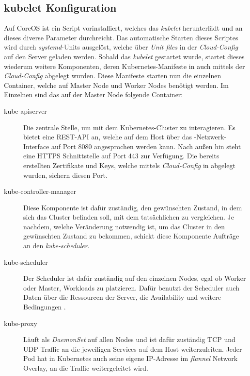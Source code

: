 \subsection{kubelet Konfiguration}
Auf CoreOS ist ein Script vorinstalliert, welches das \emph{kubelet} herunterlädt und
an dieses diverse Parameter durchreicht.
Das automatische Starten dieses Scriptes wird durch \emph{systemd}-Units ausgelöst,
welche über \emph{Unit files} in der \emph{Cloud-Config} auf den Server geladen werden.
Sobald das \emph{kubelet} gestartet wurde, startet dieses wiederum weitere Komponenten,
deren Kubernetes-Manifeste in  auch
mittels der \emph{Cloud-Config} abgelegt wurden.
Diese Manifeste starten nun die einzelnen Container, welche auf Master Node
und Worker Nodes benötigt werden.
Im Einzelnen sind das auf der Master Node folgende Container:

\begin{description}
  \item[kube-apiserver] Die zentrale Stelle, um mit dem Kubernetes-Cluster zu
  interagieren.
  Es bietet eine REST-API an, welche auf dem Host über das
  -Netzwerk-Interface auf Port 8080 angesprochen werden kann.
  Nach außen hin steht eine HTTPS Schnittstelle auf Port 443 zur Verfügung.
  Die bereits erstellten Zertifikate und Keys,
  welche mittels \emph{Cloud-Config} in  abgelegt wurden,
  sichern diesen Port.
  \item[kube-controller-manager] Diese Komponente ist dafür zuständig,
  den gewünschten Zustand, in dem sich das Cluster befinden soll,
  mit dem tatsächlichen zu vergleichen. Je nachdem, welche Veränderung notwendig
  ist, um das Cluster in den gewünschten Zustand zu bekommen, schickt diese
  Komponente
  Aufträge an den \emph{kube-scheduler}.
  \item[kube-scheduler] Der Scheduler ist dafür zuständig auf den einzelnen Nodes,
  egal ob Worker oder Master, Workloads zu platzieren. Dafür benutzt der Scheduler
  auch Daten über die Ressourcen der Server, die Availability und
  weitere Bedingungen \cite{k8sscheduler}.
  \item[kube-proxy] Läuft als \emph{DaemonSet} auf allen Nodes und ist dafür
  zuständig TCP und UDP Traffic an die
  jeweiligen Services auf dem Host weiterzuleiten. Jeder Pod hat in
  Kubernetes auch seine eigene IP-Adresse
  im \emph{flannel} Network Overlay, an die Traffic weitergeleitet wird.
\end{description}


